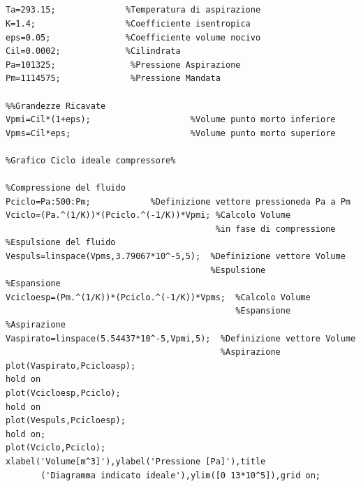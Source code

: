 \\
\\
\\
\\
\begin{lstlisting}[frame=trBL]
%%Dati
Ta=293.15;              %Temperatura di aspirazione
K=1.4;                  %Coefficiente isentropica
eps=0.05;               %Coefficiente volume nocivo
Cil=0.0002;             %Cilindrata
Pa=101325;               %Pressione Aspirazione
Pm=1114575;              %Pressione Mandata

%%Grandezze Ricavate
Vpmi=Cil*(1+eps);                    %Volume punto morto inferiore
Vpms=Cil*eps;                        %Volume punto morto superiore

%Grafico Ciclo ideale compressore%

%Compressione del fluido
Pciclo=Pa:500:Pm;            %Definizione vettore pressioneda Pa a Pm
Vciclo=(Pa.^(1/K))*(Pciclo.^(-1/K))*Vpmi; %Calcolo Volume 
                                          %in fase di compressione
%Espulsione del fluido
Vespuls=linspace(Vpms,3.79067*10^-5,5);  %Definizione vettore Volume 
                                         %Espulsione
%Espansione
Vcicloesp=(Pm.^(1/K))*(Pciclo.^(-1/K))*Vpms;  %Calcolo Volume 
                                              %Espansione
%Aspirazione
Vaspirato=linspace(5.54437*10^-5,Vpmi,5);  %Definizione vettore Volume 
                                           %Aspirazione
plot(Vaspirato,Pcicloasp);
hold on
plot(Vcicloesp,Pciclo);
hold on 
plot(Vespuls,Pcicloesp);
hold on;
plot(Vciclo,Pciclo);
xlabel('Volume[m^3]'),ylabel('Pressione [Pa]'),title
       ('Diagramma indicato ideale'),ylim([0 13*10^5]),grid on;
\end{lstlisting}

